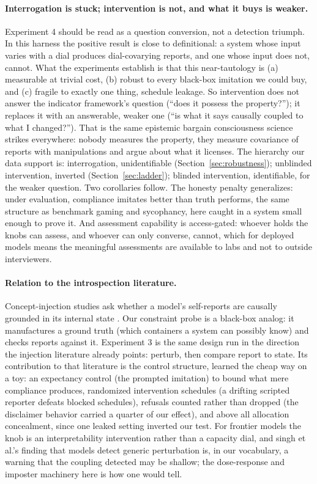\documentclass[11pt]{article}
\begin{document}
\paragraph{Interrogation is stuck; intervention is not, and what it buys is
weaker.} Experiment 4 should be read as a question conversion, not a
detection triumph. In this harness the positive result is close to
definitional: a system whose input varies with a dial produces dial-covarying
reports, and one whose input does not, cannot. What the experiments establish
is that this near-tautology is (a) measurable at trivial cost, (b) robust to
every black-box imitation we could buy, and (c) fragile to exactly one thing,
schedule leakage. So intervention does not answer the indicator framework's
question (``does it possess the property?''); it replaces it with an
answerable, weaker one (``is what it says causally coupled to what I
changed?''). That is the same epistemic bargain consciousness science strikes
everywhere: nobody measures the property, they measure covariance of reports
with manipulations and argue about what it licenses. The hierarchy our data
support is: interrogation, unidentifiable (Section~\ref{sec:robustness});
unblinded intervention, inverted (Section~\ref{sec:ladder}); blinded
intervention, identifiable, for the weaker question. Two corollaries follow.
The honesty penalty generalizes: under evaluation, compliance imitates better
than truth performs, the same structure as benchmark gaming and sycophancy,
here caught in a system small enough to prove it. And assessment capability
is access-gated: whoever holds the knobs can assess, and whoever can only
converse, cannot, which for deployed models means the meaningful assessments
are available to labs and not to outside interviewers.

\paragraph{Relation to the introspection literature.} Concept-injection studies
ask whether a model's self-reports are causally grounded in its internal state
\cite{lindsey2025,singh2026}. Our constraint probe is a black-box analog: it
manufactures a ground truth (which containers a system can possibly know) and
checks reports against it. Experiment 3 is the same design run in the
direction the injection literature already points: perturb, then compare
report to state. Its contribution to that literature is the control
structure, learned the cheap way on a toy: an expectancy control (the
prompted imitation) to bound what mere compliance produces, randomized
intervention schedules (a drifting scripted reporter defeats blocked
schedules), refusals counted rather than dropped (the disclaimer behavior
carried a quarter of our effect), and above all allocation concealment, since
one leaked setting inverted our test. For frontier models the knob is an
interpretability intervention rather than a capacity dial, and singh et
al.'s finding that models detect generic perturbation \cite{singh2026} is,
in our vocabulary, a warning that the coupling detected may be shallow; the
dose-response and imposter machinery here is how one would tell.
\end{document}
